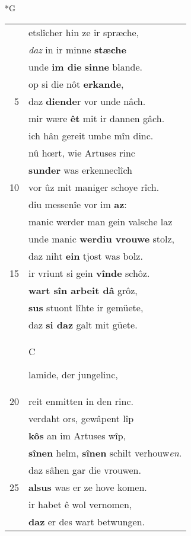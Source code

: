 \documentclass[8pt,a4paper,notitlepage]{article}
\begin{document}
\begin{table}[ht]
\begin{minipage}[t]{0.5\linewidth}
\small
\begin{center}*G
\end{center}
\begin{tabular}{rl}
 & etslîcher hin ze ir spræche,\\ 
 & \textit{daz} in ir minne \textbf{stæche}\\ 
 & unde \textbf{im die} \textbf{sinne} blande.\\ 
 & op si die nôt \textbf{erkande},\\ 
5 & daz \textbf{diende}r vor unde nâch.\\ 
 & mir wære \textbf{êt} mit ir dannen gâch.\\ 
 & ich hân gereit umbe mîn dinc.\\ 
 & nû hœrt, wie Artuses rinc\\ 
 & \textbf{sunder} was erkenneclîch\\ 
10 & vor ûz mit maniger schoye rîch.\\ 
 & diu messenîe vor im \textbf{az}:\\ 
 & manic werder man gein valsche laz\\ 
 & unde manic \textbf{werdiu vrouwe} stolz,\\ 
 & daz niht \textbf{ein} tjost was bolz.\\ 
15 & ir vriunt si gein \textbf{vînde} schôz.\\ 
 & \textbf{wart sîn arbeit dâ} grôz,\\ 
 & \textbf{sus} stuont lîhte ir gemüete,\\ 
 & daz \textbf{si daz} galt mit güete.\\ 
 & \begin{large}C\end{large}lamide, der jungelinc,\\ 
20 & reit enmitten in den rinc.\\ 
 & verdaht ors, gewâpent lîp\\ 
 & \textbf{kôs} an im Artuses wîp,\\ 
 & \textbf{sînen} helm, \textbf{sînen} schilt verhouw\textit{en}.\\ 
 & daz sâhen gar die vrouwen.\\ 
25 & \textbf{alsus} was er ze hove komen.\\ 
 & ir habet ê wol vernomen,\\ 
 & \textbf{daz} er des wart betwungen.\\ 

\end{tabular}
\end{minipage}
\end{table}
\end{document}
